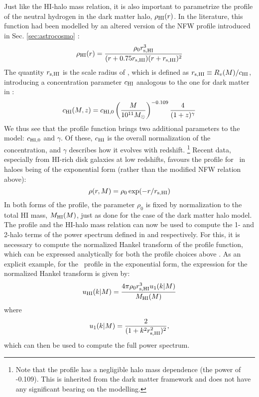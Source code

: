 Just like the HI-halo mass relation, it is also important to parametrize the profile of the neutral hydrogen in the dark matter halo, $\rho_{\rm HI}(r)$. In the literature, this function had been modelled by an altered version of the NFW profile introduced in Sec. \ref{sec:astrocosmo} \cite{maller2004, barnes2014, hpar2017}:
\begin{equation}
\rho_{\rm HI} (r) = \frac{\rho_0 r_{\rm s, HI}^3}{(r + 0.75 r_{\rm s, HI}) (r+r_{\rm s, HI})^2}
\label{rhodefnfw}
\end{equation}
The quantity $r_{\rm s,HI}$ is the scale radius of \HI, which is defined as $r_{\rm s, HI} \equiv R_v(M)/c_{\rm HI}$, introducing a concentration parameter $c_{\rm HI}$ analogous to the one for dark matter in :
\begin{equation}
    c_{\rm HI}(M,z) =  c_{\rm HI, 0} \left(\frac{M}{10^{11} M_{\odot}} \right)^{-0.109} \frac{4}{(1+z)^{\gamma}}
    \label{concparamhi}
\end{equation}
We thus see that the profile function brings two additional parameters to the model: $c_{\rm HI, 0}$ and $\gamma$. Of these, $c_{\rm HI}$ is the overall normalization of the concentration, and $\gamma$ describes how it evolves with redshift. \footnote{Note that the profile has a negligible halo mass dependence (the power of -0.109). This is inherited from the dark matter framework\cite{duffy}  and does not have any significant bearing on the modelling.}
Recent data, especially from HI-rich disk galaxies \cite{bigiel2012} at low redshifts, favours the profile for \HI\ in haloes being of the exponential form (rather than the modified NFW relation above):
\begin{equation}
    \rho(r,M) = \rho_0 \exp(-r/r_{\rm s, HI})
\label{rhodefexp}
\end{equation}
In both forms of the profile, the parameter $\rho_0$ is fixed by normalization to the total HI mass, $M_{\rm HI}(M)$, just as done for  the case of the dark matter halo model.
The profile and the HI-halo mass relation can now be used to compute the 1- and 2-halo terms of the power spectrum defined in  and  respectively. For this, it is necessary to compute the normalized Hankel transform of the profile function, which can be expressed analytically for both the profile choices above \cite{hparaa2017}.
As an explicit example, for  the \HI\ profile in the exponential form, the  expression for the normalized Hankel transform is given by:
\begin{equation}
u_{\rm HI}(k|M) = \frac{4 \pi \rho_0 r_{\rm s, HI}^3 u_1(k|M)}{M_{\rm HI} (M)}
\end{equation}
where
\begin{equation}
u_1(k|M) = \frac{2}{(1 + k^2 r_{\rm s, HI}^2)^2},
\end{equation}
which can then be used to compute the full power spectrum.


